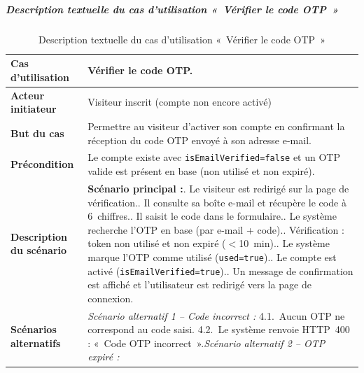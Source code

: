 \subparagraph{Description textuelle du cas d'utilisation «~Vérifier le code OTP~»}

\begin{table}[H]
  \caption{Description textuelle du cas d'utilisation «~Vérifier le code OTP~»}
  \label{tab:cu-verifier-otp}
  \centering
  \begin{tabularx}{\textwidth}{|L{3.8cm}|X|}
    \hline
    \textbf{Cas d'utilisation} & Vérifier le code OTP. \\
    \hline
    \textbf{Acteur initiateur} & Visiteur inscrit (compte non encore activé) \\
    \hline
    \textbf{But du cas} & Permettre au visiteur d'activer son compte en confirmant la réception du code OTP envoyé à son adresse e-mail. \\
    \hline
    \textbf{Précondition} & Le compte existe avec \texttt{isEmailVerified=false} et un OTP valide est présent en base (non utilisé et non expiré). \\
    \hline
    \textbf{Description du scénario} &
    \textbf{Scénario principal :}. Le visiteur est redirigé sur la page de vérification.. Il consulte sa boîte e-mail et récupère le code à 6~chiffres.. Il saisit le code dans le formulaire.. Le système recherche l'OTP en base (par e-mail + code).. Vérification : token non utilisé et non expiré ($<$10~min).. Le système marque l'OTP comme utilisé (\texttt{used=true}).. Le compte est activé (\texttt{isEmailVerified=true}).. Un message de confirmation est affiché et l'utilisateur est redirigé vers la page de connexion.\\
    \hline
    \textbf{Scénarios alternatifs} &
    \textit{Scénario alternatif 1 -- Code incorrect :}\newline
    \hspace*{6pt}4.1.~Aucun OTP ne correspond au code saisi.\newline
    \hspace*{6pt}4.2.~Le système renvoie HTTP~400 : «~Code OTP incorrect~».\newline[2pt]
    \textit{Scénario alternatif 2 -- OTP expiré :}\newline

\end{tabularx}
\end{table}
